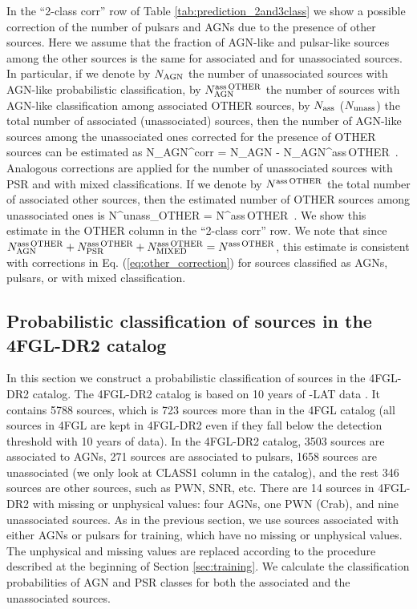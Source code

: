 In the ``2-class corr'' row of Table \ref{tab:prediction_2and3class}
we show a possible correction of the number of pulsars and AGNs due to the presence of other sources.
Here we assume that the fraction of AGN-like and pulsar-like sources among the other sources is the same for associated and for unassociated sources.
In particular, if we denote by $N_{\rm AGN}$ the number of unassociated sources with AGN-like probabilistic classification,
by $N_{\rm AGN}^{\rm ass\,OTHER}$ the number of sources with AGN-like classification among associated OTHER sources,
by $N_{\rm ass}$ ($N_{\rm unass}$) the total number of associated (unassociated) sources, then
the number of AGN-like sources among the unassociated ones corrected for the presence of OTHER sources can be estimated as
\bea
{}
N_{\rm AGN}^{\rm corr} = N_{\rm AGN} - N_{\rm AGN}^{\rm ass\,OTHER} \,.
\eea
Analogous corrections are applied for the number of unassociated sources with PSR and with mixed classifications.
If we denote by $N^{\rm ass\,OTHER}$ the total number of associated other sources, then the estimated number of 
OTHER sources among unassociated ones is
\bea
{}
N^{\rm unass}_{\rm OTHER} = N^{\rm ass\,OTHER} \,.
\eea
We show this estimate in the OTHER column in the ``2-class corr'' row.
We note that since 
$N_{\rm AGN}^{\rm ass\,OTHER} + N_{\rm PSR}^{\rm ass\,OTHER} + N_{\rm MIXED}^{\rm ass\,OTHER} = N^{\rm ass\,OTHER}$,
this estimate is consistent with corrections in Eq. (\ref{eq:other_correction}) for sources classified as AGNs, pulsars, or with mixed classification.







\subsection{Probabilistic classification of sources in the 4FGL-DR2 catalog}

In this section we construct a probabilistic classification of sources in the 4FGL-DR2 catalog. The 4FGL-DR2 catalog \citep{2020arXiv200511208B} 
is based on 10 years of \Fermi-LAT data \citep[compared to 8 years of data in the 4FGL catalog,][]{2020ApJS..247...33A}.
It contains 5788 sources, which is 723 sources more than in the 4FGL catalog (all sources in 4FGL are kept in 4FGL-DR2 even if they fall
below the detection threshold with 10 years of data). 
In the 4FGL-DR2 catalog,
3503 sources are associated to AGNs,
271 sources are associated to pulsars,
1658 sources are unassociated (we only look at CLASS1 column in the catalog), 
and the rest 346 sources are other sources, such as PWN, SNR, etc.
There are 14 sources in 4FGL-DR2 with missing or unphysical values: four AGNs, one PWN (Crab), and nine unassociated sources.
As in the previous section, we use sources associated with either AGNs or pulsars for training,
which have no missing or unphysical values.
The unphysical and missing values are replaced according to the procedure described at the beginning of Section \ref{sec:training}.
We calculate the classification probabilities of AGN and PSR classes for both the associated and the unassociated sources.

